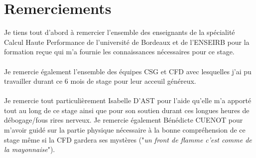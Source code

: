 \section*{Remerciements}
Je tiens tout d'abord à remercier l'ensemble des enseignants de la spécialité Calcul Haute Performance de l'université de Bordeaux et de l'ENSEIRB pour la formation reçue qui m'a fournie les connaissances nécessaires pour ce stage.

\paragraph{}Je remercie également l'ensemble des équipes CSG et CFD avec lesquelles j'ai pu travailler durant ce 6 mois de stage pour leur acceuil généreux.

\paragraph{}Je remercie tout particulièrement Isabelle D'AST pour l'aide qu'elle m'a apporté tout au long de ce stage ainsi que pour son soutien durant ces longues heures de débogage/fous rires nerveux. Je remercie également Bénédicte CUENOT pour m'avoir guidé sur la partie physique nécessaire à la bonne compréhension de ce stage même si la CFD gardera ses mystères ("\textit{un front de flamme c'est comme de la mayonnaise}").
